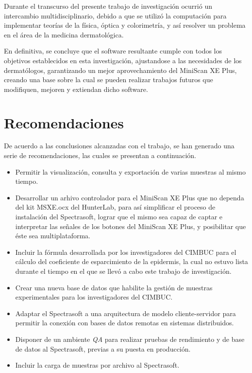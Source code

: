 	Durante el transcurso del presente trabajo de investigaci\'{o}n ocurri\'{o} un intercambio multidisciplinario, debido a que se utiliz\'{o} la computaci\'{o}n para implementar teor\'{i}as de la f\'{i}sica, \'{o}ptica y colorimetr\'{i}a, y as\'{i} resolver un problema en el \'{a}rea de la medicina dermatol\'{o}gica.

	En definitiva, se concluye que el software resultante cumple con todos los objetivos establecidos en esta investigaci\'{o}n, ajustandose a las necesidades de los dermat\'{o}logos, garantizando un mejor aprovechamiento del MiniScan XE Plus, creando una base sobre la cual se pueden realizar trabajos futuros que modifiquen, mejoren y extiendan dicho software.

\newpage

\section{Recomendaciones}

	De acuerdo a las conclusiones alcanzadas con el trabajo, se han generado una serie de recomendaciones, las cuales se presentan a continuaci\'{o}n.

\begin{itemize}

	\item Permitir la visualizaci\'{o}n, consulta y exportaci\'{o}n de varias muestras al mismo tiempo.
	
	\item Desarrollar un arhivo controlador para el MiniScan XE Plus que no dependa del kit MSXE.ocx del HunterLab, para as\'{i} simplificar el proceso de instalaci\'{o}n del Spectrasoft, lograr que el mismo sea capaz de captar e interpretar las se\~{n}ales de los botones del MiniScan XE Plus, y posibilitar que \'{e}ste sea multiplataforma.
	
	\item Incluir la f\'{o}rmula desarrollada por los investigadores del CIMBUC para el c\'{a}lculo del coeficiente de esparcimiento de la epidermis, la cual no estuvo lista durante el tiempo en el que se llev\'{o} a cabo este trabajo de investigaci\'{o}n.
	
	\item Crear una nueva base de datos que habilite la gesti\'{o}n de muestras experimentales para los investigadores del CIMBUC.
	
	\item Adaptar el Spectrasoft a una arquitectura de modelo cliente-servidor para permitir la conexi\'{o}n con bases de datos remotas en sistemas distribuidos.
	
	\item Disponer de un ambiente \textit{QA} para realizar pruebas de rendimiento y de base de datos al Spectrasoft, previas a su puesta en producci\'{o}n.
	
	\item Incluir la carga de muestras por archivo al Spectrasoft.
\end{itemize}